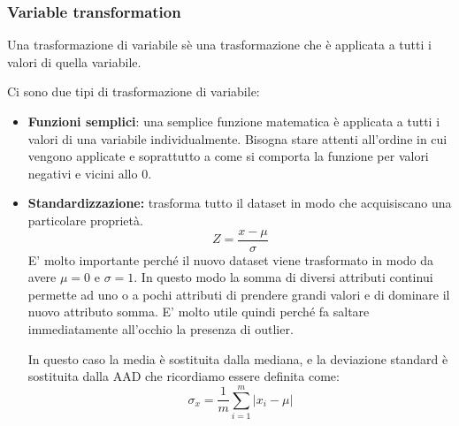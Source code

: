 \subsubsection{Variable transformation}

\begin{defn}
Una trasformazione di variabile sè una trasformazione che è applicata a tutti i valori di quella variabile.
\end{defn}

Ci sono due tipi di trasformazione di variabile:
\begin{itemize}
	\item \textbf{Funzioni semplici}: una semplice funzione matematica è applicata a tutti i valori di una variabile individualmente. Bisogna stare attenti all'ordine in cui vengono applicate e soprattutto a come si comporta la funzione per valori negativi e vicini allo 0.
	\item \textbf{Standardizzazione:} trasforma tutto il dataset in modo che acquisiscano una particolare proprietà.
	\[Z = \frac{x - \mu}{\sigma}\]
	E' molto importante perché il nuovo dataset viene trasformato in modo da avere $\mu = 0$ e $\sigma = 1$. In questo modo la somma di diversi attributi continui permette ad uno o a pochi attributi di prendere grandi valori e di dominare il nuovo attributo somma. E' molto utile quindi perché fa saltare immediatamente all'occhio la presenza di outlier.
	
	In questo caso la media è sostituita dalla mediana, e la deviazione standard è sostituita dalla AAD che ricordiamo essere definita come:
	\[\sigma_{x} = \frac{1}{m} \sum_{i = 1}^{m}|x_{i}- \mu|\]
\end{itemize}
